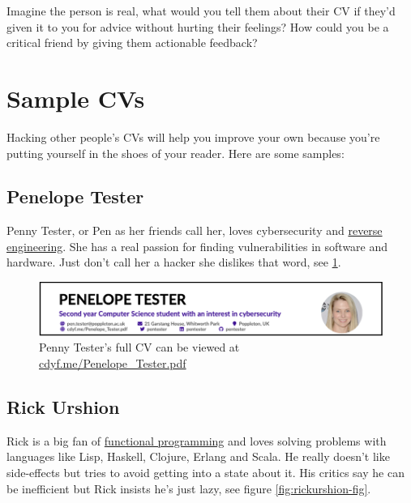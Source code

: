 \documentclass[
]{book}
\begin{document}
Imagine the person is real, what would you tell them about their CV if they'd given it to you for advice without hurting their feelings? How could you be a critical friend by giving them actionable feedback?

\hypertarget{sample-cvs}{%
\section{Sample CVs}\label{sample-cvs}}

Hacking other people's CVs will help you improve your own because you're putting yourself in the shoes of your reader. Here are some samples:

\hypertarget{pen-tester}{%
\subsection{Penelope Tester}\label{pen-tester}}

Penny Tester, or Pen as her friends call her, loves cybersecurity and \href{https://en.wikipedia.org/wiki/Reverse_engineering}{reverse engineering}. She has a real passion for finding vulnerabilities in software and hardware. Just don't call her a hacker she dislikes that word, see \ref{fig:pentester-fig}.

\begin{figure}

{\centering \includegraphics[width=1\linewidth]{images/pen_tester} 

}

\caption{Penny Tester's full CV can be viewed at \href{https://www.cdyf.me/Penelope_Tester.pdf}{cdyf.me/Penelope\_Tester.pdf}}\label{fig:pentester-fig}
\end{figure}



\hypertarget{rick-urshion}{%
\subsection{Rick Urshion}\label{rick-urshion}}

Rick is a big fan of \href{https://en.wikipedia.org/wiki/Functional_programming}{functional programming} and loves solving problems with languages like Lisp, Haskell, Clojure, Erlang and Scala. He really doesn't like side-effects but tries to avoid getting into a state about it. His critics say he can be inefficient but Rick insists he's just lazy, see figure \ref{fig:rickurshion-fig}.
\end{document}
